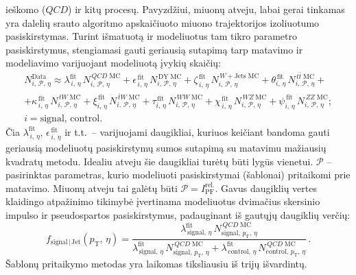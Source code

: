 \documentclass[a4paper, 12pt, oneside]{article}
\newcommand{\pT}{p_{\mathrm{T}}}
\newcommand{\tbarW}{\bar{t}W}
\newcommand{\ttbar}{t\bar{t}}
\newcommand{\QCD}{QC\! D}
\newlength\q
\begin{document}
\begin{enumerate}
	ieškomo ($\QCD$) ir kitų procesų.
	Pavyzdžiui, miuonų atveju, labai gerai tinkamas yra dalelių srauto algoritmo apskaičiuoto miuono trajektorijos izoliuotumo
	pasiskirstymas.
	Turint išmatuotą ir modeliuotus tam tikro parametro pasiskirstymus, stengiamasi gauti geriausią sutapimą tarp matavimo ir
	modeliavimo varijuojant modeliuotą įvykių skaičių:
	\begin{multline}
		N^{\mathrm{Data}}_{i, \, \mathcal{P}, \, \eta} \approx
		\lambda^{\mathrm{fit}}_{\,i, \, \eta}\, N^{\,\QCD \; \mathrm{MC}}_{i, \, \mathcal{P}, \, \eta} +
		\epsilon^{\,\mathrm{fit}}_{\,i, \, \eta}\, N^{\,\mathrm{DY} \; \mathrm{MC}}_{i, \, \mathcal{P}, \, \eta} +
		\zeta^{\,\mathrm{fit}}_{\,i, \, \eta}\, N^{\,W+\mathrm{Jets} \; \mathrm{MC}}_{i, \, \mathcal{P}, \, \eta} +
		\theta^{\,\mathrm{fit}}_{i, \, \eta}\, N^{\,\ttbar \; \mathrm{MC}}_{i, \, \mathcal{P}, \, \eta} + \\[7pt] +
		\kappa^{\,\mathrm{fit}}_{\,i, \, \eta}\, N^{\,tW \; \mathrm{MC}}_{i, \, \mathcal{P}, \, \eta} + 
		\xi^{\,\mathrm{fit}}_{i, \, \eta}\, N^{\,\tbarW \; \mathrm{MC}}_{i, \, \mathcal{P}, \, \eta} +
		\tau^{\,\mathrm{fit}}_{i, \, \eta}\, N^{\,WW \; \mathrm{MC}}_{i, \, \mathcal{P}, \, \eta} +
		\chi^{\,\mathrm{fit}}_{\,i, \, \eta}\, N^{\,W\!Z \; \mathrm{MC}}_{i, \, \mathcal{P}, \, \eta} +
		\psi^{\,\mathrm{fit}}_{i, \, \eta}\, N^{\,Z\!Z \; \mathrm{MC}}_{i, \, \mathcal{P}, \, \eta}; \\ i = \mathrm{signal}, \, \mathrm{control}.
	\end{multline}
	Čia $\lambda^{\mathrm{fit}}_{\,i, \, \eta}$, $\epsilon^{\,\mathrm{fit}}_{\,i, \, \eta}$ ir t.t.\ -- varijuojami daugikliai,
	kuriuos keičiant bandoma gauti geriausią modeliuotų pasiskirstymų sumos sutapimą su matavimu mažiausių kvadratų metodu.
	Idealiu atveju šie daugikliai turėtų būti lygūs vienetui. 
	$\mathcal{P}$ -- pasirinktas parametras, kurio modeliuoti pasiskirstymai (šablonai) pritaikomi prie matavimo.
	Miuonų atveju tai galėtų būti $\mathcal{P}=I^{\mathrm{rel.}}_{\mathrm{PF}}$.
	Gavus daugiklių vertes klaidingo atpažinimo tikimybė įvertinama modeliuotus dvimačius skersinio impulso ir pseudospartos pasiskirstymus,
	padauginant iš gautųjų daugiklių verčių:
	\begin{equation}
		f_{\mathrm{signal} \,| \,\mathrm{Jet}}(\pT, \, \eta) =
		\frac{\lambda^{\mathrm{fit}}_{\,\mathrm{signal}, \, \eta}\, N^{\,\QCD \; \mathrm{MC}}_{\mathrm{signal}, \, \pT, \, \eta}}
		{\lambda^{\mathrm{fit}}_{\,\mathrm{signal}, \, \eta}\, N^{\,\QCD \; \mathrm{MC}}_{\mathrm{signal}, \, \pT, \, \eta} +
		\lambda^{\mathrm{fit}}_{\,\mathrm{control}, \, \eta}\, N^{\,\QCD \; \mathrm{MC}}_{\mathrm{control}, \, \pT, \, \eta}}\, .
	\end{equation}
	Šablonų pritaikymo metodas yra laikomas tiksliausiu iš trijų išvardintų.
\end{enumerate}
\end{document}
